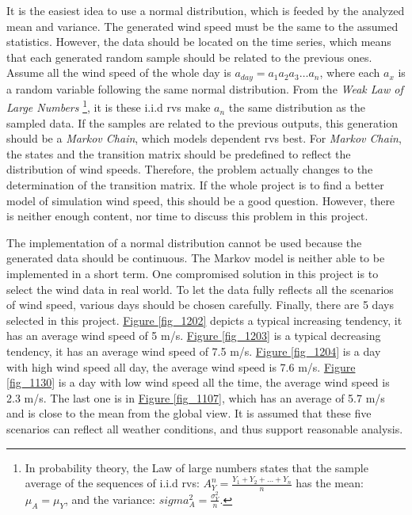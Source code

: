 \documentclass[12pt,a4paper]{report}
\begin{document}
                It is the easiest idea to use a normal distribution, which is feeded by the analyzed mean and variance. The generated wind speed must be the same to the assumed statistics. However, the data should be located on the time series, which means that each generated random sample should be related to the previous ones. Assume all the wind speed of the whole day is $a_{day} = a_1a_2a_3\dots a_n$, where each $a_x$ is a random variable following the same normal distribution. From the \emph{Weak Law of Large Numbers} \footnote{In probability theory, the Law of large numbers states that the sample average of the sequences of i.i.d rvs: $A_{Y}^n = \frac{Y_1 + Y_2 + \dots + Y_n}{n}$ has the mean: $\mu_A = \mu_Y$, and the variance: $sigma_A^2 = \frac{\sigma_Y^2}{n}$.}, it is these i.i.d rvs make $a_n$ the same distribution as the sampled data. If the samples are related to the previous outputs, this generation should be a \emph{Markov Chain}, which models dependent rvs best. For \emph{Markov Chain}, the states and the transition matrix should be predefined to reflect the distribution of wind speeds. Therefore, the problem actually changes to the determination of the transition matrix. If the whole project is to find a better model of simulation wind speed, this should be a good question. However, there is neither enough content, nor time to discuss this problem in this project.

                The implementation of a normal distribution cannot be used because the generated data should be continuous. The Markov model is neither able to be implemented in a short term. One compromised solution in this project is to select the wind data in real world. To let the data fully reflects all the scenarios of wind speed, various days should be chosen carefully. 
                Finally, there are 5 days selected in this project. \hyperref[fig_1202]{Figure \ref*{fig_1202}} depicts a typical increasing tendency, it has an average wind speed of 5 m/s. \hyperref[fig_1203]{Figure \ref*{fig_1203}} is a typical decreasing tendency, it has an average wind speed of 7.5 m/s. \hyperref[fig_1204]{Figure \ref*{fig_1204}} is a day with high wind speed all day, the average wind speed is 7.6 m/s. \hyperref[fig_1130]{Figure \ref*{fig_1130}} is a day with low wind speed all the time, the average wind speed is 2.3 m/s. The last one is in \hyperref[fig_1107]{Figure \ref*{fig_1107}}, which has an average of 5.7 m/s and is close to the mean from the global view. It is assumed that these five scenarios can reflect all weather conditions, and thus support reasonable analysis.
\end{document}
